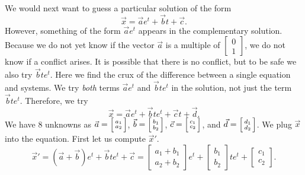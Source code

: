 \begin{example}
We would next want to guess a particular solution of the form
\begin{equation*}
\vec{x} = 
\vec{a}
e^{t}
+
\vec{b}
t +
\vec{c} .
\end{equation*}
However, something of the form $\vec{a} e^t$ appears in the complementary
solution.  Because we do not yet know if the vector $\vec{a}$
is a multiple of $\left[ \begin{smallmatrix}
0 \\
1
\end{smallmatrix} \right]$, we do not know if a conflict
arises.  It is possible that there is no conflict,
but to be safe we also try
$\vec{b} t e^t$.
Here we find
the crux of the difference between a single equation and systems.  We try
\emph{both} terms $\vec{a} e^t$ and $\vec{b} t e^t$ in the solution,
not just the term $\vec{b} t e^t$.
Therefore, we try
\begin{equation*}
\vec{x} = 
\vec{a}
e^{t}
+
\vec{b}
t
e^{t}
+
\vec{c}
t +
\vec{d}.
\end{equation*}
We have 8 unknowns as
$\vec{a} =
\Bigl[ \begin{smallmatrix} a_1 \\ a_2 \end{smallmatrix} \Bigr]$,
$\vec{b} =
\Bigl[ \begin{smallmatrix} b_1 \\ b_2 \end{smallmatrix} \Bigr]$,
$\vec{c} =
\Bigl[ \begin{smallmatrix} c_1 \\ c_2 \end{smallmatrix} \Bigr]$,
and
$\vec{d} =
\Bigl[ \begin{smallmatrix} d_1 \\ d_2 \end{smallmatrix} \Bigr]$.
We plug $\vec{x}$ into the equation.  First
let us compute ${\vec{x}}'$.
\begin{equation*}
{\vec{x}}' = 
\left( \vec{a} + \vec{b} \right)
e^{t}
+
\vec{b}
t
e^{t}
+
\vec{c} =
\begin{bmatrix}
a_1 + b_1 \\ a_2+b_2
\end{bmatrix}
e^{t}
+
\begin{bmatrix}
b_1 \\ b_2
\end{bmatrix}
t e^{t}
+
\begin{bmatrix}
c_1 \\ c_2
\end{bmatrix} .

\end{equation*}
\end{example}
